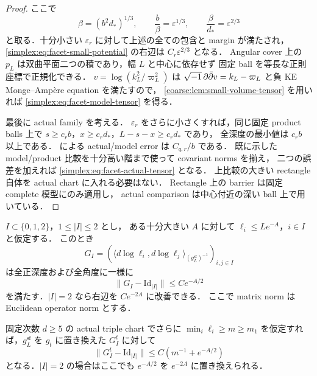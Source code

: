 \begin{proof}
ここで
\[
 \beta=(b^2d_*)^{1/3},\qquad
 \frac b\beta=\varepsilon^{1/3},\qquad
 \frac\beta{d_*}=\varepsilon^{2/3}
\]
と取る．十分小さい $\varepsilon_r$ に対して上述の全ての包含と margin が満たされ，
\eqref{simplex:eq:facet-small-potential} の右辺は $C_r\varepsilon^{2/3}$ となる．
Angular cover 上の $p_L$ は双曲平面二つの積であり，幅 $L$ と中心に依存せず
固定 ball を等長な正則座標で正規化できる．
$v=\log(k_L^2/\varpi_L^2)$ は
$\sqrt{-1}\,\partial\bar\partial v=k_L-\varpi_L$ と負 KE Monge--Amp\`ere equation を満たすので，
\cref{coarse:lem:small-volume-tensor} を用いれば
\eqref{simplex:eq:facet-model-tensor} を得る．

最後に actual family を考える．
$\varepsilon_r$ をさらに小さくすれば，同じ固定 product balls 上で
$s\ge c_r b$，$x\ge c_r d_*$，$L-s-x\ge c_r d_*$ であり，
全深度の最小値は $c_r b$ 以上である．
 による actual/model error は $C_{q,r}/b$ である．
既に示した model/product 比較を十分高い階まで使って covariant norms を揃え，
二つの誤差を加えれば \eqref{simplex:eq:facet-actual-tensor} となる．
上比較の大きい rectangle 自体を actual chart に入れる必要はない．
Rectangle 上の barrier は固定 complete 模型にのみ適用し，
actual comparison は中心付近の深い ball 上で用いている．
\end{proof}

\begin{corollary}
\label{simplex:cor:active-cogram}
$I\subset\{0,1,2\}$，$1\le|I|\le2$ とし，
ある十分大きい $A$ に対して $\ell_i\le Le^{-A}$，$i\in I$ と仮定する．
このとき
\[
 G_I=\left(
   \langle d\log\ell_i,d\log\ell_j\rangle_{(g_L^{\mathrm{sf}})^{-1}}
      \right)_{i,j\in I}
\]
は全正深度および全角度に一様に
\begin{equation}\label{simplex:eq:active-cogram}
 \|G_I-\mathrm{Id}_{|I|}\|\le Ce^{-A/2}
\end{equation}
を満たす．$|I|=2$ なら右辺を $Ce^{-2A}$ に改善できる．
ここで matrix norm は Euclidean operator norm とする．

固定次数 $d\ge5$ の actual triple chart でさらに
$\min_i\ell_i\ge m\ge m_1$ を仮定すれば，$g_L^{\mathrm{sf}}$ を $g_t$ に置き換えた
$G_I^t$ に対して
\begin{equation}\label{simplex:eq:actual-active-cogram}
 \|G_I^t-\mathrm{Id}_{|I|}\|
       \le C\left(m^{-1}+e^{-A/2}\right)
\end{equation}
となる．$|I|=2$ の場合はここでも $e^{-A/2}$ を $e^{-2A}$ に置き換えられる．
\end{corollary}

